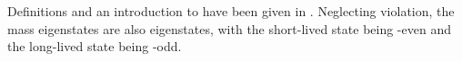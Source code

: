 Definitions and an introduction to \DGs have been given in .
Neglecting \CP violation, the mass eigenstates are
also \CP eigenstates, with the short-lived state being
\CP-even and the long-lived state being \CP-odd.
%
%

